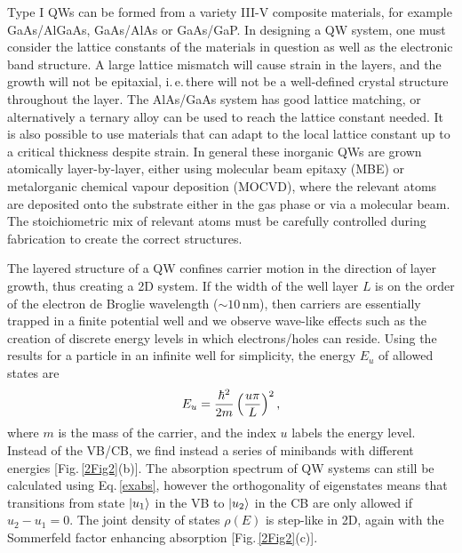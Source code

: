 Type I QWs can be formed from a variety III-V composite materials, for example GaAs/AlGaAs, GaAs/AlAs or GaAs/GaP. In designing a QW system, one must consider the lattice constants of the materials in question as well as the electronic band structure. A large lattice mismatch will cause strain in the layers, and the growth will not be epitaxial, i.\,e.\,there will not be a well-defined crystal structure throughout the layer. The AlAs/GaAs system has good lattice matching, or alternatively a ternary alloy can be used to reach the lattice constant needed. It is also possible to use materials that can adapt to the local lattice constant up to a critical thickness despite strain. In general these inorganic QWs are grown atomically layer-by-layer, either using molecular beam epitaxy (MBE) or metalorganic chemical vapour deposition (MOCVD), where the relevant atoms are deposited onto the substrate either in the gas phase or via a molecular beam. The stoichiometric mix of relevant atoms must be carefully controlled during fabrication to create the correct structures. 

The layered structure of a QW confines carrier motion in the direction of layer growth, thus creating a 2D system. If the width of the well layer $L$ is on the order of the electron de Broglie wavelength ($\sim10$\,nm), then carriers are essentially trapped in a finite potential well and we observe wave-like effects such as the creation of discrete energy levels in which electrons/holes can reside. Using the results for a particle in an infinite well for simplicity, the energy $E_u$ of allowed states are
\begin{equation}
\centering
E_u = \frac{\hbar^2}{2m} \left(\frac{u\pi}{L}\right)^2 ,
\label{particleboxenergy}
\end{equation}
where $m$ is the mass of the carrier, and the index $u$ labels the energy level. Instead of the VB/CB, we find instead a series of minibands with different energies [Fig.\,\ref{2Fig2}(b)]. The absorption spectrum of QW systems can still be calculated using Eq.\,\ref{exabs}, however the orthogonality of eigenstates means that transitions from state $\Ket{u_1}$ in the VB to $\Ket{u_2}$ in the CB are only allowed if $u_2-u_1=0$. The joint density of states $\rho(E)$ is step-like in 2D, again with the Sommerfeld factor enhancing absorption [Fig.\,\ref{2Fig2}(c)].

